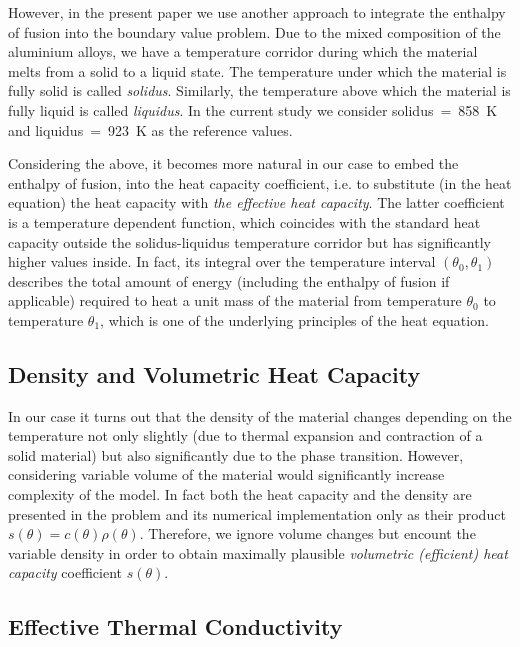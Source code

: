 However, in the present paper we use another approach to integrate the enthalpy of fusion into the boundary value problem. Due to the mixed composition of the aluminium alloys, we have a temperature corridor during which the material melts from a solid to a liquid state. The temperature under which the material is fully solid is called \emph{solidus}. Similarly, the temperature above which the material is fully liquid is called \emph{liquidus}. In the current study we consider solidus~=~\SI{858}{\K} and liquidus~=~\SI{923}{K} as the reference values.

Considering the above, it becomes more natural in our case to embed the enthalpy of fusion, into the heat capacity coefficient, i.e. to substitute (in the heat equation) the heat capacity with \emph{the effective heat capacity}. The latter coefficient is a temperature dependent function, which coincides with the standard heat capacity outside the solidus-liquidus temperature corridor but has significantly higher values inside. In fact, its integral over the temperature interval $(\theta_0, \theta_1)$ describes the total amount of energy (including the enthalpy of fusion if applicable) required to heat a unit mass of the material from temperature $\theta_0$ to temperature $\theta_1$, which is one of the underlying principles of the heat equation.


\subsection{Density and Volumetric Heat Capacity}

In our case it turns out that the density of the material changes depending on the temperature not only slightly (due to thermal expansion and contraction of a solid material) but also significantly due to the phase transition. However, considering variable volume of the material would significantly increase complexity of the model. In fact both the heat capacity and the density are presented in the problem and its numerical implementation only as their product $s(\theta) = c(\theta) \rho(\theta)$. Therefore, we ignore volume changes but encount the variable density in order to obtain maximally plausible \emph{volumetric (efficient) heat capacity} coefficient $s(\theta)$.


\subsection{Effective Thermal Conductivity}

